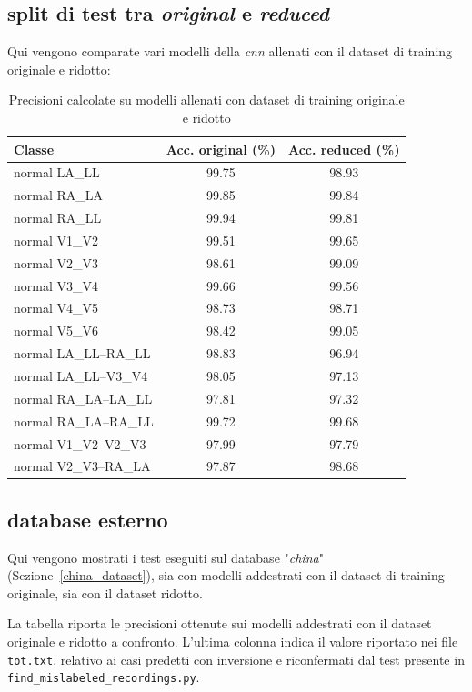\subsection{split di test tra \emph{original} e \emph{reduced}}

Qui vengono comparate vari modelli della \emph{cnn} allenati con il dataset di training originale e ridotto:

\begin{table}[htbp]
	\centering
	\caption{Precisioni calcolate su modelli allenati con dataset di training originale e ridotto}
	\label{tab:orig_vs_reduced}
	\begin{tabular}{lcc}
		\toprule
		Classe & Acc. original (\%) & Acc. reduced (\%) \\
		\midrule
		normal LA\_LL 	& 99.75 & 98.93 \\
		normal RA\_LA 	& 99.85 & 99.84 \\
		normal RA\_LL 	& 99.94 & 99.81 \\
		normal V1\_V2 	& 99.51 & 99.65 \\
		normal V2\_V3 	& 98.61 & 99.09 \\
		normal V3\_V4 	& 99.66 & 99.56 \\
		normal V4\_V5 	& 98.73 & 98.71 \\
		normal V5\_V6 	& 98.42 & 99.05 \\
		normal LA\_LL--RA\_LL 	& 98.83 & 96.94 \\
		normal LA\_LL--V3\_V4 	& 98.05 & 97.13 \\
		normal RA\_LA--LA\_LL 	& 97.81 & 97.32 \\
		normal RA\_LA--RA\_LL 	& 99.72	& 99.68 \\
		normal V1\_V2--V2\_V3 	& 97.99 & 97.79 \\
		normal V2\_V3--RA\_LA 	& 97.87	& 98.68 \\
		
		\bottomrule
	\end{tabular}
\end{table}


\subsection{database esterno}
Qui vengono mostrati i test eseguiti sul database "\emph{china}" (Sezione~\ref{china_dataset}), sia con modelli addestrati con il dataset di training originale, sia con il dataset ridotto.

La tabella riporta le precisioni ottenute sui modelli addestrati con il dataset originale e ridotto a confronto. L'ultima colonna indica il valore riportato nei file \texttt{tot.txt}, relativo ai casi predetti con inversione e riconfermati dal test presente in \texttt{find\_mislabeled\_recordings.py}.

